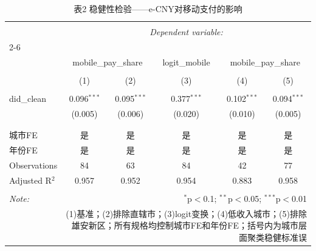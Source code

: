 
\begin{table}[!htbp] \centering 
  \caption{表2  稳健性检验——e-CNY对移动支付的影响} 
  \label{tab:robustness} 
\begin{tabular}{@{\extracolsep{5pt}}lccccc} 
\\[-1.8ex]\hline 
\hline \\[-1.8ex] 
 & \multicolumn{5}{c}{\textit{Dependent variable:}} \\ 
\cline{2-6} 
\\[-1.8ex] & \multicolumn{2}{c}{mobile\_pay\_share} & logit\_mobile & \multicolumn{2}{c}{mobile\_pay\_share} \\ 
\\[-1.8ex] & (1) & (2) & (3) & (4) & (5)\\ 
\hline \\[-1.8ex] 
 did\_clean & 0.096$^{***}$ & 0.095$^{***}$ & 0.377$^{***}$ & 0.102$^{***}$ & 0.094$^{***}$ \\ 
  & (0.005) & (0.006) & (0.020) & (0.010) & (0.005) \\ 
  & & & & & \\ 
\hline \\[-1.8ex] 
城市FE & 是 & 是 & 是 & 是 & 是 \\ 
年份FE & 是 & 是 & 是 & 是 & 是 \\ 
Observations & 84 & 63 & 84 & 42 & 77 \\ 
Adjusted R$^{2}$ & 0.957 & 0.952 & 0.954 & 0.883 & 0.958 \\ 
\hline 
\hline \\[-1.8ex] 
\textit{Note:}  & \multicolumn{5}{r}{$^{*}$p$<$0.1; $^{**}$p$<$0.05; $^{***}$p$<$0.01} \\ 
 & \multicolumn{5}{r}{(1)基准；(2)排除直辖市；(3)logit变换；(4)低收入城市；(5)排除雄安新区；所有规格均控制城市FE和年份FE；括号内为城市层面聚类稳健标准误} \\ 
\end{tabular} 
\end{table} 
